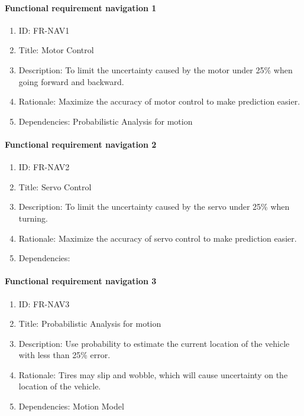 \documentclass[compsoc,draftclsnofoot,onecolumn,10pt]{IEEEtran}
\begin{document}
	\paragraph{Functional requirement navigation 1}
		\begin{enumerate}
			\item ID: FR-NAV1
			\item Title: Motor Control
			\item Description: To limit the uncertainty caused by the motor under 25\% when going forward and backward.
			\item Rationale: Maximize the accuracy of motor control to make prediction easier.
			\item Dependencies: Probabilistic Analysis for motion
		\end{enumerate}

	\paragraph{Functional requirement navigation 2}
		\begin{enumerate}
			\item ID: FR-NAV2
			\item Title: Servo Control
			\item Description: To limit the uncertainty caused by the servo under 25\% when turning.
			\item Rationale: Maximize the accuracy of servo control to make prediction easier.
			\item Dependencies:
		\end{enumerate}

	\paragraph{Functional requirement navigation 3}
		\begin{enumerate}
			\item ID: FR-NAV3
			\item Title: Probabilistic Analysis for motion
			\item Description: Use probability to estimate the current location of the vehicle with less than 25\% error.
			\item Rationale: Tires may slip and wobble, which will cause uncertainty on the location of the vehicle.
			\item Dependencies: Motion Model
		\end{enumerate}
\end{document}
